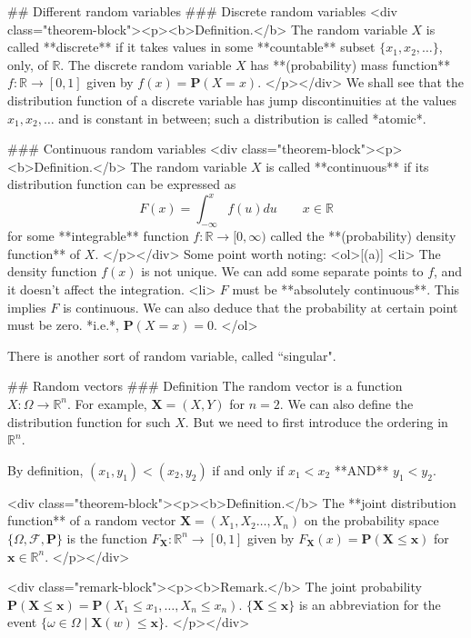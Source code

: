 ## Different random variables
### Discrete random variables
<div class="theorem-block"><p><b>Definition.</b> 
The random variable $X$ is called **discrete** if it takes values in some **countable** subset $\{ x_1, x_2, \dots \}$, only, of $\mathbb{R}$. The discrete random variable $X$ has **(probability) mass function** $f : \mathbb{R} \to [0, 1]$ given by $f(x) = \mathbf{P}(X = x)$. 
</p></div>
We shall see that the distribution function of a discrete variable has jump discontinuities 
at the values $x_1 , x_2, \dots$ and is constant in between; such a distribution is called *atomic*.

### Continuous random variables
<div class="theorem-block"><p><b>Definition.</b> 
The random variable $X$ is called **continuous** if its distribution function can 
be expressed as 
$$\begin{equation}
    F(x) = \int_{-\infty}^x f(u) du \qquad x \in \mathbb{R}
\end{equation}$$
for some **integrable** function $f : \mathbb{R} \to [0, \infty)$ called the **(probability) density function** of $X$. 
</p></div>
Some point worth noting:
<ol>[(a)]
    <li> The density function $f(x)$ is not unique. We can add some separate points to $f$, and it doesn't affect the integration.
    <li> $F$ must be **absolutely continuous**. This implies $F$ is continuous. We can also deduce that the probability at certain point must be zero. *i.e.*, $\mathbf{P}(X=x) = 0$.
</ol>

There is another sort of random variable, called ``singular".


## Random vectors
### Definition
The random vector is a function $X : \Omega \to \mathbb{R}^n$. For example, $\mathbf{X} = (X, Y)$ for $n=2$. We can also define the distribution function for such $X$. But we need to first introduce the ordering in $\mathbb{R}^n$.
\begin{center}
    By definition, $(x_1, y_1) < (x_2, y_2)$ if and only if $x_1 < x_2$  **AND**  $y_1 < y_2$.
\end{center}

<div class="theorem-block"><p><b>Definition.</b> 
The **joint distribution function** of a random vector $\mathbf{X} = (X_1, X_2 \dots, X_n)$ on the probability space $\{ \Omega, \mathcal{F}, \mathbf{P} \}$ is the function $F_{\mathbf{X}} : \mathbb{R}^n \to [0, 1]$ given by $F_{\mathbf{X}}(x) = \mathbf{P}(\mathbf{X} \leq \mathbf{x})$ for $\mathbf{x} \in \mathbb{R}^n$. 
</p></div>

<div class="remark-block"><p><b>Remark.</b> 
The joint probability $\mathbf{P}(\mathbf{X} \leq \mathbf{x}) = \mathbf{P}(X_1 \leq x_1, \dots, X_n \leq x_n)$. $\{\mathbf{X} \leq \mathbf{x} \}$ is an abbreviation for the event $\{\omega \in \Omega \;\vert\; \mathbf{X}(w) \leq \mathbf{x}\}$.
</p></div>

